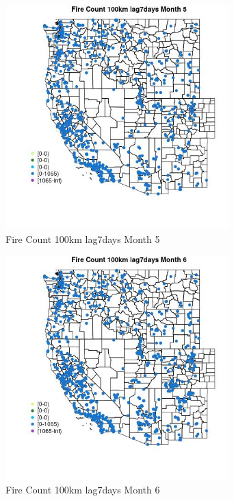 \begin{figure} 
\centering  
\includegraphics[width=0.77\textwidth]{Code_Outputs/Report_ML_input_PM25_Step4_part_f_de_duplicated_aveswNAs_MapObsMo5Fire_Count_100km_lag7days.jpg} 
\caption{\label{fig:Report_ML_input_PM25_Step4_part_f_de_duplicated_aveswNAsMapObsMo5Fire_Count_100km_lag7days}Fire Count 100km lag7days Month 5} 
\end{figure} 
 

\begin{figure} 
\centering  
\includegraphics[width=0.77\textwidth]{Code_Outputs/Report_ML_input_PM25_Step4_part_f_de_duplicated_aveswNAs_MapObsMo6Fire_Count_100km_lag7days.jpg} 
\caption{\label{fig:Report_ML_input_PM25_Step4_part_f_de_duplicated_aveswNAsMapObsMo6Fire_Count_100km_lag7days}Fire Count 100km lag7days Month 6} 
\end{figure} 
 

